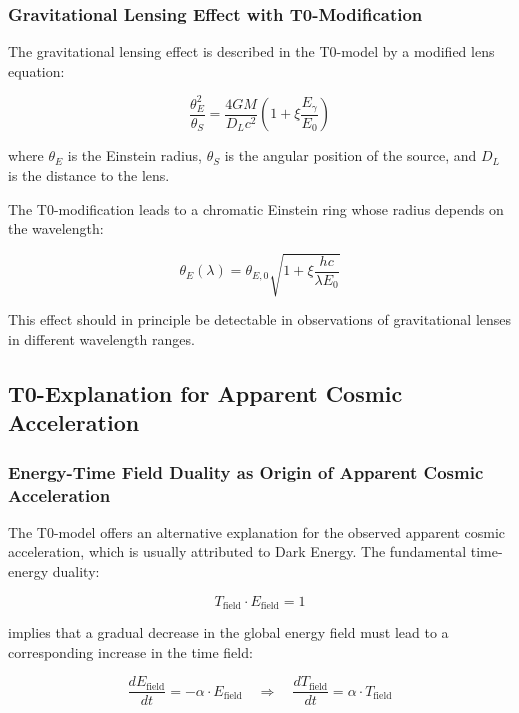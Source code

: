 \documentclass[12pt,a4paper]{article}
\theoremstyle{definition}
\begin{document}
	\subsubsection{Gravitational Lensing Effect with T0-Modification}
	
	The gravitational lensing effect is described in the T0-model by a modified lens equation:
	
	\begin{equation}
		\frac{\theta_E^2}{\theta_S} = \frac{4GM}{D_L c^2}\left(1 + \xi \frac{E_\gamma}{E_0}\right)
	\end{equation}
	
	where $\theta_E$ is the Einstein radius, $\theta_S$ is the angular position of the source, and $D_L$ is the distance to the lens.
	
	The T0-modification leads to a chromatic Einstein ring whose radius depends on the wavelength:
	
	\begin{equation}
		\theta_E(\lambda) = \theta_{E,0} \sqrt{1 + \xi \frac{hc}{\lambda E_0}}
	\end{equation}
	
	This effect should in principle be detectable in observations of gravitational lenses in different wavelength ranges.
	
	\subsection{T0-Explanation for Apparent Cosmic Acceleration}
	
	\subsubsection{Energy-Time Field Duality as Origin of Apparent Cosmic Acceleration}
	
	The T0-model offers an alternative explanation for the observed apparent cosmic acceleration, which is usually attributed to Dark Energy. The fundamental time-energy duality:
	
	\begin{equation}
		T_{\text{field}} \cdot E_{\text{field}} = 1
	\end{equation}
	
	implies that a gradual decrease in the global energy field must lead to a corresponding increase in the time field:
	
	\begin{equation}
		\frac{dE_{\text{field}}}{dt} = -\alpha \cdot E_{\text{field}} \quad \Rightarrow \quad \frac{dT_{\text{field}}}{dt} = \alpha \cdot T_{\text{field}}
	\end{equation}
	
\end{document}
